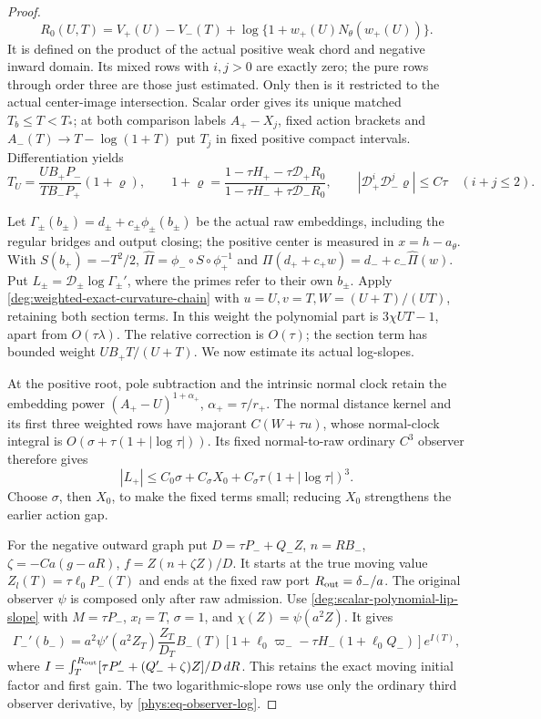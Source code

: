 \begin{proof}
\begin{equation}
 R_0(U,T)=V_+(U)-V_-(T)
       +\log\{1+w_+(U)N_\theta(w_+(U))\}.
\end{equation}
It is defined on the product of the actual positive weak chord and
negative inward domain. Its mixed rows with \(i,j>0\) are exactly zero;
the pure rows through order three are those just estimated.
Only then is it restricted to the actual center-image intersection.
Scalar order gives its unique matched
\(T_b\le T<T_*\); at both comparison labels \(A_+-X_j\),
fixed action brackets and \(A_-(T)\to T-\log(1+T)\) put \(T_j\)
in fixed positive compact intervals. Differentiation yields
\[
 T_U=\frac{UB_+P_-}{TB_-P_+}(1+\varrho),\qquad
 1+\varrho=\frac{1-\tau H_+-\tau\mathcal D_+R_0}
                   {1-\tau H_-+\tau\mathcal D_-R_0},\qquad
 |\mathcal D_+^i\mathcal D_-^j\varrho|\le C\tau\quad(i+j\le2).
\]

Let \(\Gamma_\pm(b_\pm)=d_\pm+c_\pm\phi_\pm(b_\pm)\) be the
actual raw embeddings, including the regular bridges and output closing;
the positive center is measured in \(x=h-a_\theta\).
With \(S(b_+)=-T^2/2\),
\(\widehat\Pi=\phi_-\circ S\circ\phi_+^{-1}\) and
\(\Pi(d_++c_+w)=d_-+c_-\widehat\Pi(w)\).
Put \(L_\pm=\mathcal D_\pm\log\Gamma_\pm'\), where the primes
refer to their own \(b_\pm\). Apply \eqref{deg:weighted-exact-curvature-chain} with
\(u=U,v=T,W=(U+T)/(UT)\), retaining both section terms.
In this weight the polynomial part is
\(3\chi UT-1\), apart from \(O(\tau\lambda)\).
The relative correction is \(O(\tau)\); the section term has bounded
weight \(UB_+T/(U+T)\). We now estimate its actual log-slopes.

At the positive root, pole subtraction and the intrinsic normal clock
retain the embedding power \((A_+-U)^{1+\alpha_+}\),
\(\alpha_+=\tau/r_+\). The normal distance kernel and its first
three weighted rows have majorant \(C(W+\tau u)\), whose normal-clock
integral is \(O(\sigma+\tau(1+|\log\tau|))\).
Its fixed normal-to-raw ordinary \(C^3\) observer therefore gives
\[
 |L_+|\le C_0\sigma+C_\sigma X_0+
                         C_\sigma\tau(1+|\log\tau|)^3.
\]
Choose \(\sigma\), then \(X_0\), to make the fixed terms small;
reducing \(X_0\) strengthens the earlier action gap.

For the negative outward graph put
\(D=\tau P_-+Q_-Z\), \(n=RB_-\),
\(\zeta=-Ca(g-aR)\), \(f=Z(n+\zeta Z)/D\).
It starts at the true moving value \(Z_l(T)=\tau\ell_0P_-(T)\)
and ends at the fixed raw port \(R_{\rm out}=\delta_-/a\).
The original observer \(\psi\) is composed only after raw admission.
Use \eqref{deg:scalar-polynomial-lip-slope} with
\(M=\tau P_-\), \(x_l=T\), \(\sigma=1\), and
\(\chi(Z)=\psi(a^2Z)\). It gives
\[
 \Gamma_-'(b_-)=a^2\psi'(a^2Z_T)\frac{Z_T}{D_T}B_-(T)
 [1+\ell_0\varpi_--\tau H_-(1+\ell_0Q_-)]e^{I(T)},
\]
where \(I=\int_T^{R_{\rm out}}[\tau P_-'+(Q_-'+\zeta)Z]/D\,dR\).
This retains the exact moving initial factor and first gain.
The two logarithmic-slope rows use only the ordinary third observer
derivative, by \eqref{phys:eq-observer-log}.


\end{proof}
